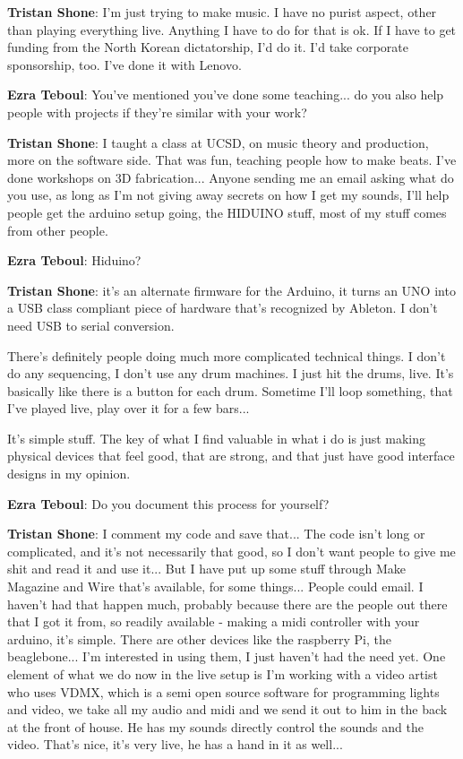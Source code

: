 \textbf{Tristan Shone}: I'm just trying to make music. I have no purist aspect, other than playing everything live. Anything I have to do for that is ok. If I have to get funding from the North Korean dictatorship, I'd do it. I'd take corporate sponsorship, too. I've done it with Lenovo. 

\textbf{Ezra Teboul}: You've mentioned you've done some teaching... do you also help people with projects if they're similar with your work? 

\textbf{Tristan Shone}: I taught a class at UCSD, on music theory and production, more on the software side. That was fun, teaching people how to make beats. I've done workshops on 3D fabrication... Anyone sending me an email asking what do you use, as long as I'm not giving away secrets on how I get my sounds, I'll help people get the arduino setup going, the HIDUINO stuff, most of my stuff comes from other people. 

\textbf{Ezra Teboul}: Hiduino? 

\textbf{Tristan Shone}: it's an alternate firmware for the Arduino, it turns an UNO into a USB class compliant piece of hardware that's recognized by Ableton. I don't need USB to serial conversion. 

There's definitely people doing much more complicated technical things. I don't do any sequencing, I don't use any drum machines. I just hit the drums, live. It's basically like there is a button for each drum. Sometime I'll loop something, that I've played live, play over it for a few bars... 

It's simple stuff. The key of what I find valuable in what i do is just making physical devices that feel good, that are strong, and that just have good interface designs in my opinion. 

\textbf{Ezra Teboul}: Do you document this process for yourself? 

\textbf{Tristan Shone}: I comment my code and save that... The code isn't long or complicated, and it's not necessarily that good, so I don't want people to give me shit and read it and use it... But I have put up some stuff through Make Magazine and Wire that's available, for some things... People could email. I haven't had that happen much, probably because there are the people out there that I got it from, so readily available - making a midi controller with your arduino, it's simple. There are other devices like the raspberry Pi, the beaglebone... I'm interested in using them, I just haven't had the need yet. One element of what we do now in the live setup is I'm working with a video artist who uses VDMX, which is a semi open source software for programming lights and video, we take all my audio and midi and we send it out to him in the back at the front of house. He has my sounds directly control the sounds and the video. That's nice, it's very live, he has a hand in it as well... 

